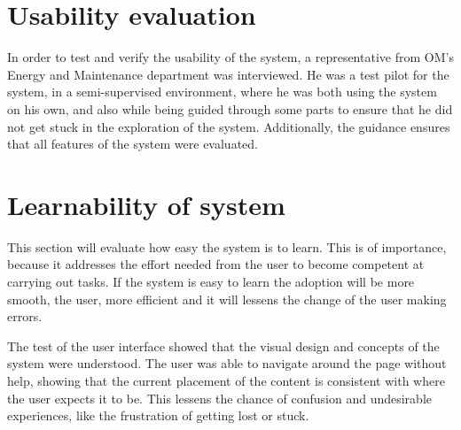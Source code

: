 \section{Usability evaluation }
In order to test and verify the usability of the system, a representative from OM’s Energy and Maintenance department was interviewed.  He was a test pilot for the system, in a semi-supervised environment, where he was both using the system on his own, and also while being guided through some parts to ensure that he did not get stuck in the exploration of the system. Additionally, the guidance ensures that all features of the system were evaluated.
\section*{Learnability of system}
This section will evaluate how easy the system is to learn. This is of importance, because it addresses the effort needed from the user to become competent at carrying out tasks. If the system is easy to learn the adoption will be more smooth, the user, more efficient and it will lessens the change of the user making errors.

The test of the user interface showed that the visual design and concepts of the system were understood. The user was able to navigate around the page without help, showing that the current placement of the content is consistent with where the user expects it to be. This lessens the chance of confusion and undesirable experiences, like the frustration of getting lost or stuck.

